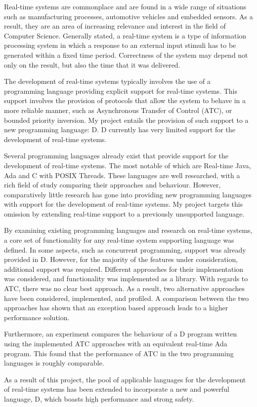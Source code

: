 
Real-time systems are commonplace and are found in a wide range of 
situations such as manufacturing processes, automotive vehicles and embedded 
sensors. As a result, they are an area of increasing relevance and interest in the field 
of Computer Science. Generally stated, a real-time system is a type of information 
processing system in which a response to an external input stimuli 
has to be generated within a fixed time period. Correctness of the 
system may depend not only on the result, but also the time that it was delivered. 
\par\bigskip\noindent
The development of real-time systems typically involves the use of a programming 
language providing explicit support for real-time systems. 
This support involves the provision of protocols that allow the system to 
behave in a more reliable manner, such as Asynchronous Transfer of Control
(ATC), or bounded priority inversion. 
My project entails the provision of such support to a new programming language: 
D. D currently has very limited support for the development of real-time systems. 
\par\bigskip\noindent
Several programming languages already exist that provide support for the 
development of real-time systems. The most notable of which are 
Real-time Java, Ada and C with POSIX Threads. These languages are well researched, 
with a rich field of study comparing their approaches and behaviour. 
However, comparatively little research has gone into providing new programming 
languages with support for the development of real-time systems. My project 
targets this omission by extending real-time support to a previously unsupported 
language.
\par\bigskip\noindent
By examining existing programming languages and research on real-time systems, a core set 
of functionality for any real-time system supporting language was defined. 
In some aspects, such as concurrent programming, support was already provided in D. 
However, for the majority of the features under consideration, additional support was required. 
Different approaches for their implementation was considered, and functionality 
was implemented as a library. 
With regards to ATC, there was no clear 
best approach. As a result, two alternative approaches have 
been considered, implemented, and profiled. A comparison between the two approaches 
has shown that an exception based approach leads to a higher performance 
solution. 
\par\bigskip\noindent
Furthermore, an experiment compares the behaviour of a D program written 
using the implemented ATC approaches with an equivalent 
real-time Ada program. This found that the performance of ATC in the two 
programming languages is roughly comparable. 
\par\bigskip\noindent
As a result of this project, the pool of applicable languages for the development 
of real-time systems has been extended to incorporate a new and powerful language, D, which 
boasts high performance and strong safety. 
